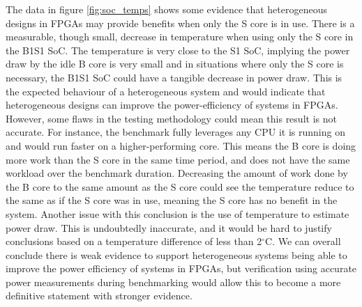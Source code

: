 The data in figure \ref{fig:soc_temps} shows some evidence that heterogeneous designs in FPGAs may provide benefits when only the S core is in use. There is a measurable, though small, decrease in temperature when using only the S core in the B1S1 SoC. The temperature is very close to the S1 SoC, implying the power draw by the idle B core is very small and in situations where only the S core is necessary, the B1S1 SoC could have a tangible decrease in power draw. This is the expected behaviour of a heterogeneous system and would indicate that heterogeneous designs can improve the power-efficiency of systems in FPGAs. However, some flaws in the testing methodology could mean this result is not accurate. For instance, the benchmark fully leverages any CPU it is running on and would run faster on a higher-performing core. This means the B core is doing more work than the S core in the same time period, and does not have the same workload over the benchmark duration. Decreasing the amount of work done by the B core to the same amount as the S core could see the temperature reduce to the same as if the S core was in use, meaning the S core has no benefit in the system. Another issue with this conclusion is the use of temperature to estimate power draw. This is undoubtedly inaccurate, and it would be hard to justify conclusions based on a temperature difference of less than 2$^{\circ}$C. We can overall conclude there is weak evidence to support heterogeneous systems being able to improve the power efficiency of systems in FPGAs, but verification using accurate power measurements during benchmarking would allow this to become a more definitive statement with stronger evidence.